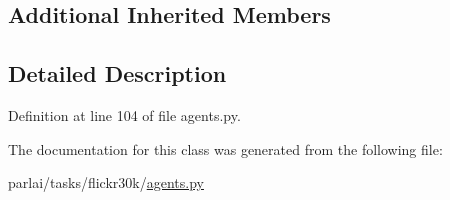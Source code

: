 \subsection*{Additional Inherited Members}


\subsection{Detailed Description}


Definition at line 104 of file agents.\+py.



The documentation for this class was generated from the following file\+:\begin{DoxyCompactItemize}
\item 
parlai/tasks/flickr30k/\hyperlink{parlai_2tasks_2flickr30k_2agents_8py}{agents.\+py}\end{DoxyCompactItemize}

